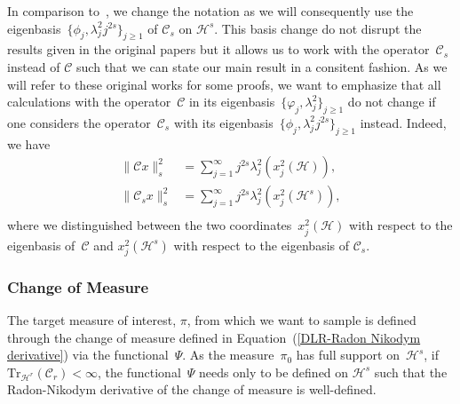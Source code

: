 \begin{rem}
  In comparison to~\autocite{Mattingly2010, Pillai2012}, we change the notation as we will consequently use the eigenbasis~$\{ \phi_j,  \lambda_j^2 j^{2s} \}_{j \geq 1}$ of $\mathcal{C}_s$ on $\mathcal{H}^s$. This basis change do not disrupt the results given in the original papers but it allows us to work with the operator~$\mathcal{C}_s$ instead of $\mathcal{C}$ such that we can state our main result in a consitent fashion. As we will refer to these original works for some  proofs, we want to emphasize that all calculations with the operator~$\mathcal{C}$ in its eigenbasis~$\{ \varphi_j,  \lambda_j^2 \}_{j \geq 1}$ do not change if one considers the operator~$\mathcal{C}_s$ with its eigenbasis~$\{ \phi_j,  \lambda_j^2 j^{2s} \}_{j \geq 1}$ instead. Indeed, we have
  \begin{equation}
    \begin{split}
      \| \mathcal{C}x \|_s^2 & = \sum_{j=1}^{\infty} j^{2s} \lambda_j^2 \left(x_j^2 (\mathcal{H})\right), \\
       \| \mathcal{C}_sx \|_s^2 & = \sum_{j=1}^{\infty} j^{2s} \lambda_j^2 \left(x_j^2(\mathcal{H}^s)\right),\\
    \end{split}
  \end{equation}
 where we distinguished between the two coordinates~$x_j^2 (\mathcal{H}) $ with respect to the eigenbasis of~$\mathcal{C}$ and $x_j^2(\mathcal{H}^s)$ with respect to the eigenbasis of $\mathcal{C}_s$.
\end{rem}




\subsubsection{Change of Measure}

The target measure of interest, $\pi$, from which we want to sample is defined through the change of measure defined in Equation~(\ref{DLR-Radon Nikodym derivative}) via the functional~$\Psi$. As the measure~$\pi_0$ has full support on~$\mathcal{H}^s$, if $\text{Tr}_{\mathcal{H}^r}(\mathcal{C}_r) < \infty$, the functional~$\Psi$ needs only to be defined on $\mathcal{H}^s$ such that the Radon-Nikodym derivative of the change of measure is well-defined.


